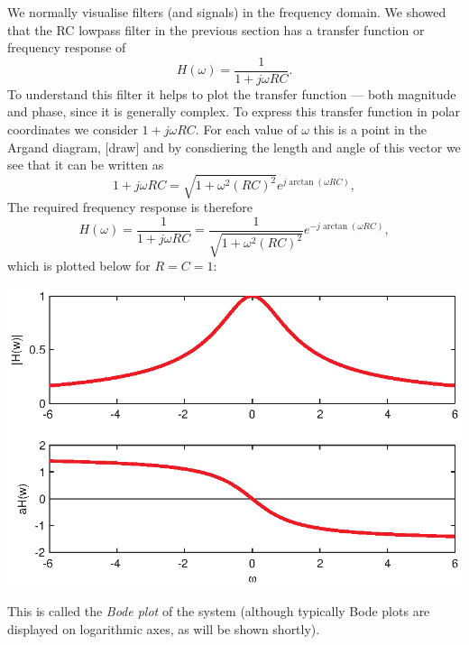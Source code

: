 \documentclass[10pt]{beamer}
\begin{document}
We normally visualise filters (and signals) in the frequency domain.  We showed that the RC lowpass filter in the previous section has a transfer function or frequency response of
\begin{equation*}
  H(\omega) = \frac{1}{1 + j \omega RC}.
\end{equation*}
To understand this filter it helps to plot the transfer function --- both magnitude and phase, since it is generally complex.  To express this transfer function in polar coordinates we consider ${1 + j \omega RC}$.  For each value of $\omega$ this is a point in the Argand diagram,
[draw]
and by consdiering the length and angle of this vector we see that it can be written as
\begin{equation*}
  1 + j \omega RC = \sqrt{1 + \omega^2 (RC)^2} e^{j \arctan(\omega RC)},
\end{equation*}
The required frequency response is therefore
\begin{equation*}
  H(\omega) = \frac{1}{1 + j \omega RC} = \frac{1}{\sqrt{1 + \omega^2 (RC)^2}} e^{-j \arctan(\omega RC)},
\end{equation*}
which is plotted below for $R = C = 1$:
\begin{center}
  \includegraphics{circrclptf}
\end{center}
This is called the {\em Bode plot} of the system (although typically Bode plots are displayed on logarithmic axes, as will be shown shortly).  
\end{document}

